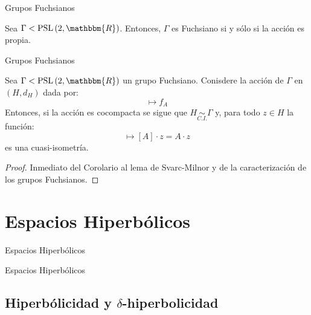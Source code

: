 \documentclass[xcolor=dvipsnames]{beamer}
\theoremstyle{largebreak}
\newcommand{\bbm}[1]{\ensuremath{\mathbbm{#1}}}
\newcommand{\qisom}{\ensuremath{\underset{C.I.}{\sim}}}
\newcommand{\PSL}[1]{\ensuremath{\textup{PSL}\left(#1\right)}}
\begin{document}
\begin{frame}{Grupos Fuchsianos}
    \begin{theor}
        Sea $\Gamma<\PSL{2,\bbm{R}}$. Entonces, $\Gamma$ es Fuchsiano si y sólo si la acción es propia.
    \end{theor}
\end{frame}

\begin{frame}{Grupos Fuchsianos}
    \begin{theor}
        Sea $\Gamma<\PSL{2,\bbm{R}}$ un grupo Fuchsiano. Conisdere la acción de $\Gamma$ en $(H,d_H)$ dada por:
        \begin{equation*}
            [A]\mapsto f_A
        \end{equation*}
        Entonces, si la acción es cocompacta se sigue que $H\qisom \Gamma$ y, para todo $z\in H$ la función:
        \begin{equation*}
            [A]\mapsto [A]\cdot z=A\cdot z
        \end{equation*}
        es una cuasi-isometría.
    \end{theor}

    \pause

    \begin{proof}
        Inmediato del Corolario al lema de Svarc-Milnor y de la caracterización de los grupos Fuchsianos.
    \end{proof}
\end{frame}

\section{Espacios Hiperbólicos}

\begin{frame}{Espacios Hiperbólicos}
    \begin{center}
        \LARGE{Espacios Hiperbólicos}
    \end{center}
\end{frame}

\subsection{Hiperbólicidad y $\delta$-hiperbolicidad}
\end{document}
